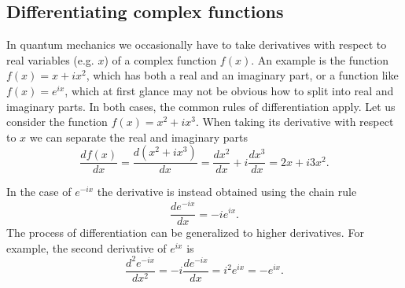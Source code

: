 \documentclass[../Main/chem331-notes.tex]{subfiles}
\begin{document}
\subsection{Differentiating complex functions}
In quantum mechanics we occasionally have to take derivatives with respect to real variables (e.g. $x$) of a complex function $f(x)$.
An example is the function $f(x) = x + i x^2 $, which has both a real and an imaginary part, or a function like $f(x) = e^{i x}$, which at first glance may not be obvious how to split into real and imaginary parts.
In both cases, the common rules of differentiation apply.
Let us consider the function $f(x) = x^2 + i x^3$. When taking its derivative with respect to $x$ we can separate the real and imaginary parts
\begin{equation}
\frac{d f(x)}{dx } = \frac{ d (x^2 + i x^3)}{dx} = \frac{ d x^2}{dx}  + i \frac{ d x^3}{dx} = 2x + i3 x^2.
\end{equation}

In the case of $e^{-i x}$ the derivative is instead obtained using the chain rule
\begin{equation}
\frac{d e^{-i x}}{dx} = - i e^{i x}.
\end{equation}
The process of differentiation can be generalized to higher derivatives. For example, the second derivative of $e^{i x}$ is 
\begin{equation}
\frac{d^2 e^{-i x}}{dx^2} = -i \frac{d e^{-i x}}{dx} = i^2 e^{i x} = - e^{i x}.
\end{equation}
\end{document}
